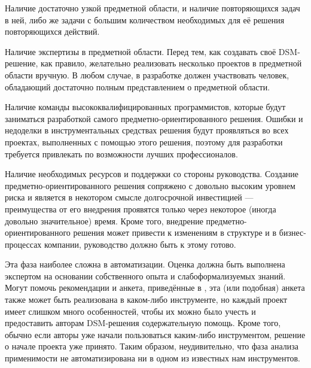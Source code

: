 Наличие достаточно узкой предметной области, и наличие повторяющихся задач в ней, 
либо же задачи с большим количеством необходимых для её решения повторяющихся действий.

Наличие экспертизы в предметной области.  Перед тем, как создавать своё DSM-решение, 
как правило, желательно реализовать несколько проектов в предметной области вручную. 
В любом случае, в разработке должен участвовать человек, обладающий достаточно полным 
представлением о предметной области.

Наличие команды высококвалифицированных программистов, которые будут заниматься разработкой 
самого предметно-ориентированного решения. Ошибки и недоделки в инструментальных средствах 
решения будут проявляться во всех проектах, выполненных с помощью этого решения, поэтому 
для разработки требуется привлекать по возможности лучших профессионалов.

Наличие необходимых ресурсов и поддержки со стороны руководства. Создание предметно-ориентированного 
решения сопряжено с довольно высоким уровнем риска и является в некотором смысле долгосрочной 
инвестицией --- преимущества от его внедрения проявятся только через некоторое (иногда 
довольно значительное) время. Кроме того, внедрение предметно-ориентированного решения 
может привести к изменениям в структуре и в бизнес-процессах компании, руководство 
должно быть к этому готово.

Эта фаза наиболее сложна в автоматизации. Оценка должна быть выполнена экспертом на 
основании собственного опыта и слабоформализуемых знаний. Могут помочь рекомендации 
и анкета, приведённые в \cite{kelly2008domain}, эта (или подобная) анкета также может 
быть реализована в каком-либо инструменте, но каждый проект имеет слишком много особенностей, 
чтобы их можно было учесть и предоставить авторам DSM-решения содержательную помощь. 
Кроме того, обычно если авторы уже начали пользоваться каким-либо инструментом, решение 
о начале проекта уже принято. Таким образом, неудивительно, что фаза анализа применимости 
не автоматизирована ни в одном из известных нам инструментов.

